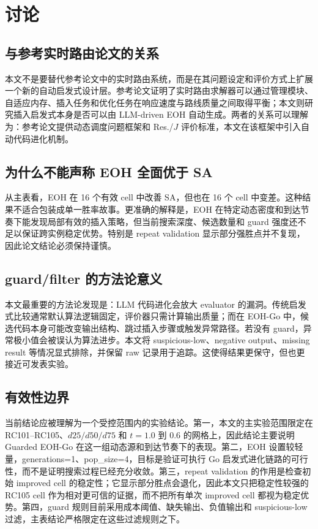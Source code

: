 \documentclass[UTF8,11pt]{ctexart}
\begin{document}
\section{讨论}
\subsection{与参考实时路由论文的关系}
本文不是要替代参考论文中的实时路由系统，而是在其问题设定和评价方式上扩展一个新的自动启发式设计层。参考论文证明了实时路由求解器可以通过管理模块、自适应内存、插入任务和优化任务在响应速度与路线质量之间取得平衡；本文则研究插入启发式本身是否可以由 LLM-driven EOH 自动生成。两者的关系可以理解为：参考论文提供动态调度问题框架和 Res./$J$ 评价标准，本文在该框架中引入自动代码进化机制。

\subsection{为什么不能声称 EOH 全面优于 SA}
从主表看，EOH 在 16 个有效 cell 中改善 SA，但也在 16 个 cell 中变差。这种结果不适合包装成单一胜率故事。更准确的解释是，EOH 在特定动态密度和到达节奏下能发现局部有效的插入策略，但当前搜索深度、候选数量和 guard 强度还不足以保证跨实例稳定优势。特别是 repeat validation 显示部分强胜点并不复现，因此论文结论必须保持谨慎。

\subsection{guard/filter 的方法论意义}
本文最重要的方法论发现是：LLM 代码进化会放大 evaluator 的漏洞。传统启发式比较通常默认算法逻辑固定，评价器只需计算输出质量；而在 EOH-Go 中，候选代码本身可能改变输出结构、跳过插入步骤或触发异常路径。若没有 guard，异常极小值会被误认为算法进步。本文将 suspicious-low、negative output、missing result 等情况显式排除，并保留 raw 记录用于追踪。这使得结果更保守，但也更接近可发表实验。

\subsection{有效性边界}
当前结论应被理解为一个受控范围内的实验结论。第一，本文的主实验范围限定在 RC101--RC105、$d25/d50/d75$ 和 $t=1.0$ 到 $0.6$ 的网格上，因此结论主要说明 Guarded EOH-Go 在这一组动态源和到达节奏下的表现。第二，EOH 设置较轻量，generations=1、pop\_size=4，目标是验证可执行 Go 启发式进化链路的可行性，而不是证明搜索过程已经充分收敛。第三，repeat validation 的作用是检查初始 improved cell 的稳定性；它显示部分胜点会退化，因此本文只把稳定性较强的 RC105 cell 作为相对更可信的证据，而不把所有单次 improved cell 都视为稳定优势。第四，guard 规则目前采用成本阈值、缺失输出、负值输出和 suspicious-low 过滤，主表结论严格限定在这些过滤规则之下。
\end{document}
